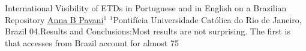 \begin{abstract_online}{International Visibility of ETDs in Portuguese and in English on a Brazilian Repository}{%
        \underline{Anna B Pavani}$^{1}$}{%
        }{%
        $^1$Pontifícia Universidade Católica do Rio de Janeiro, Brazil}
      04.Results and Conclusions:Most results are not surprising. The first is that accesses from Brazil account for almost 75%
    
    \end{abstract_online}
    
